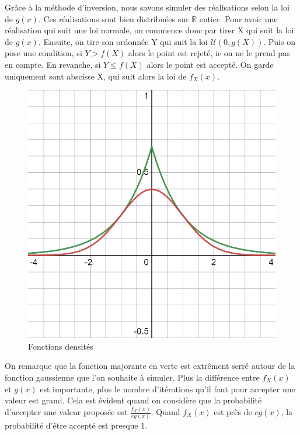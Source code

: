 \documentclass[10pt]{article} %
\begin{document}
Grâce à la méthode d'inversion, nous savons simuler des réalisations selon la loi de $g(x)$. Ces réalisations sont bien distribuées sur $  \mathbb{R} $ entier. Pour avoir une réalisation qui suit une loi normale, on commence donc par tirer X qui suit la loi de $g(x)$. Ensuite, on tire son ordonnée Y qui suit la loi $\mathcal{U}(0, g(X))$. Puis on pose une condition, si $Y > f(X)$ alors le point est rejeté, ie on ne le prend pas en compte. En revanche, si $Y \le f(X)$ alors le point est accepté. On garde uniquement sont abscisse X, qui suit alors la loi de $f_X(x)$.

\begin{figure}[h!]
\centering
\includegraphics[scale=0.3]{media/desmos-graph.png}
\caption{Fonctions densités}
\end{figure}

On remarque que la fonction majorante en verte est extrêment serré autour de la fonction gaussienne que l'on souhaite à simuler. Plus la différence entre $f_X(x)$ et $g(x)$ est importante, plus le nombre
d'itérations qu'il faut pour accepter une valeur est grand. Cela est évident quand on considère que la probabilité d'accepter une valeur proposée est $\frac{f_X(x)}{cg(x)}$. Quand $f_X(x)$ est près de $cg(x)$,
la probabilité d'être accepté est presque 1.
\end{document}
